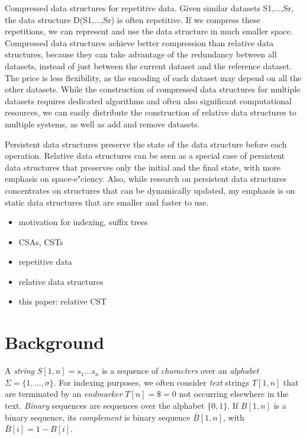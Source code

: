\documentclass[a4paper,11pt]{llncs}
\newcommand{\set}[1]{\ensuremath{\{ #1 \}}}
\renewcommand{\complement}[1]{\ensuremath{\overline{ #1 }}}
\begin{document}
Compressed data structures for repetitive data. Given similar datasets S1,...,Sr, the
data structure D(S1,...,Sr) is often repetitive. If we compress these repetitions, we can
represent and use the data structure in much smaller space. Compressed data structures
achieve better compression than relative data structures, because they can take advantage
of the redundancy between all datasets, instead of just between the current dataset and
the reference dataset. The price is less flexibility, as the encoding of each dataset may
depend on all the other datasets. While the construction of compressed data structures for
multiple datasets requires dedicated algorithms and often also significant computational
resources, we can easily distribute the construction of relative data structures to multiple
systems, as well as add and remove datasets.

Persistent data structures preserve the state of the data structure before each operation.
Relative data structures can be seen as a special case of persistent data structures
that preserves only the initial and the final state, with more emphasis on space-e"ciency.
Also, while research on persistent data structures concentrates on structures that can be
dynamically updated, my emphasis is on static data structures that are smaller and faster
to use.
\fi

\begin{itemize}
\item motivation for indexing, suffix trees
\item CSAs, CSTs
\item repetitive data
\item relative data structures
\item this paper: relative CST
\end{itemize}


\section{Background}

A \emph{string} $S[1,n] = s_{1} \dotso s_{n}$ is a sequence of \emph{characters} over an \emph{alphabet} $\Sigma = \set{1, \dotsc, \sigma}$. For indexing purposes, we often consider \emph{text} strings $T[1,n]$ that are terminated by an \emph{endmarker} $T[n] = \$ = 0$ not occurring elsewhere in the text. \emph{Binary} sequences are sequences over the alphabet $\set{0,1}$. If $B[1,n]$ is a binary sequence, its \emph{complement} is binary sequence $\complement{B}[1,n]$, with $\complement{B}[i] = 1 - B[i]$.
\end{document}
